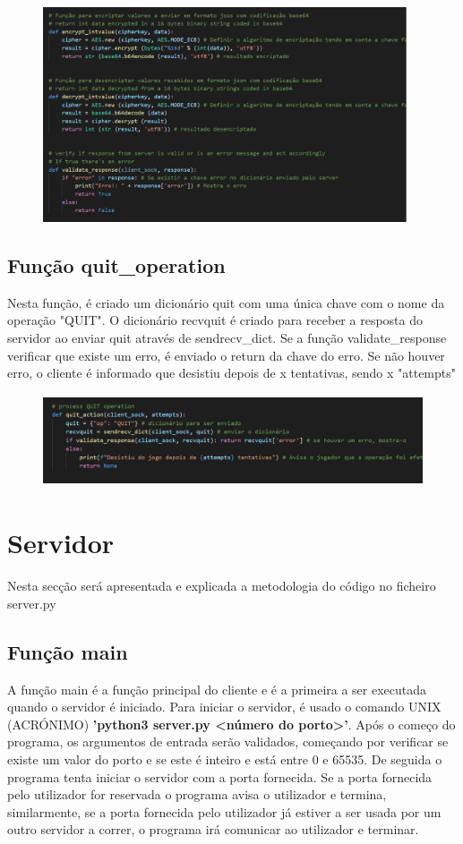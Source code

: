 \documentclass{report}
\begin{document}
\begin{figure}[!h]
\center
\includegraphics[height = 180pt]{img/cryptovalidate.png}
\end{figure}

\subsection{Função quit\_operation}
\label{ssec:quit}
Nesta função, é criado um dicionário quit com uma única chave com o nome da operação "QUIT". O dicionário recvquit é criado
para receber a resposta do servidor ao enviar quit através de sendrecv\_dict. Se a função validate\_response verificar que existe
um erro, é enviado o return da chave do erro. Se não houver erro, o cliente é informado que desistiu depois de x tentativas,
sendo x "attempts"


\begin{figure}[!h]
\center
\includegraphics[height = 77pt]{img/quit.png}
\end{figure}
\section{Servidor}
\label{sec:server}
Nesta secção será apresentada e explicada a metodologia do código no ficheiro server.py

\subsection{Função main}
\label{ssec:func_main}

A função main é a função principal do cliente e é a primeira a ser executada quando o servidor é iniciado. Para iniciar o servidor, é usado o comando UNIX (ACRÓNIMO) \textbf{'python3 server.py <número do porto>'}. Após o começo do programa, os argumentos de entrada serão validados, começando por verificar se existe um valor do porto e se este é inteiro e está entre 0 e 65535. De seguida o programa tenta iniciar o servidor com a porta fornecida. Se a porta fornecida pelo utilizador for reservada o programa avisa o utilizador e termina, similarmente, se a porta fornecida pelo utilizador já estiver a ser usada por um outro servidor a correr, o programa irá comunicar ao utilizador e terminar. 
\end{document}
